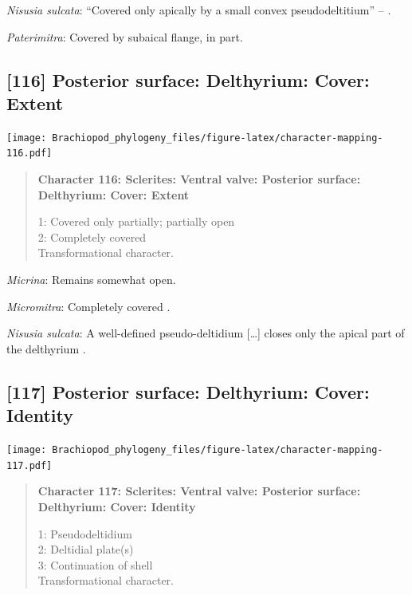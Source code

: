 \documentclass[openany]{book}
\begin{document}
\hypertarget{Nisusia_sulcata-coding-115}{}
\emph{Nisusia sulcata}: ``Covered only apically by a small convex
pseudodeltitium'' -- \citet{Holmer2018Evolutionarysignificance}.

\hypertarget{Paterimitra-coding-115}{}
\emph{Paterimitra}: Covered by subaical flange, in part.

\subsection*{{[}116{]} Posterior surface: Delthyrium: Cover:
Extent}\label{posterior-surface-delthyrium-cover-extent}

\texttt{[image: Brachiopod\_phylogeny\_files/figure-latex/character-mapping-116.pdf]}

\begin{quote}
\textbf{Character 116: Sclerites: Ventral valve: Posterior surface:
Delthyrium: Cover: Extent}

1: Covered only partially; partially open\\
2: Completely covered\\
Transformational character.
\end{quote}

\hypertarget{Micrina-coding-116}{}
\emph{Micrina}: Remains somewhat open.

\hypertarget{Micromitra-coding-116}{}
\emph{Micromitra}: Completely covered \citep[fig.
83.3]{Williams2000LinguliformeaCraniiformea}.

\hypertarget{Nisusia_sulcata-coding-116}{}
\emph{Nisusia sulcata}: A well-defined pseudo-deltidium {[}\ldots{}{]}
closes only the apical part of\\
the delthyrium \citep{Rowell1985Theevolutionary}.

\subsection*{{[}117{]} Posterior surface: Delthyrium: Cover:
Identity}\label{posterior-surface-delthyrium-cover-identity}

\texttt{[image: Brachiopod\_phylogeny\_files/figure-latex/character-mapping-117.pdf]}

\begin{quote}
\textbf{Character 117: Sclerites: Ventral valve: Posterior surface:
Delthyrium: Cover: Identity}

1: Pseudodeltidium\\
2: Deltidial plate(s)\\
3: Continuation of shell\\
Transformational character.
\end{quote}
\end{document}
